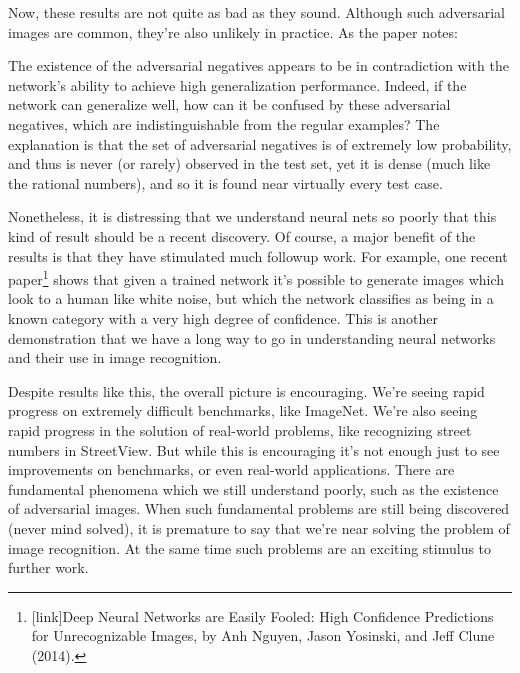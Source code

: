 \documentclass[a4paper,twoside,10pt]{book}
\begin{document}
Now, these results are not quite as bad as they sound. Although such adversarial images are common, they're also unlikely in practice. As the paper notes:
\begin{adjustwidth}{1.5cm}{0.5cm}
The existence of the adversarial negatives appears to be in contradiction with the network's ability to achieve high generalization performance. Indeed, if the network can generalize well, how can it be confused by these adversarial negatives, which are indistinguishable from the regular examples? The explanation is that the set of adversarial negatives is of extremely low probability, and thus is never (or rarely) observed in the test set, yet it is dense (much like the rational numbers), and so it is found near virtually every test case.
\end{adjustwidth}
Nonetheless, it is distressing that we understand neural nets so poorly that this kind of result should be a recent discovery. Of course, a major benefit of the results is that they have stimulated much followup work. For example, one recent paper\footnote{[link]Deep Neural Networks are Easily Fooled: High Confidence Predictions for Unrecognizable Images, by Anh Nguyen, Jason Yosinski, and Jeff Clune (2014).} shows that given a trained network it's possible to generate images which look to a human like white noise, but which the network classifies as being in a known category with a very high degree of confidence. This is another demonstration that we have a long way to go in understanding neural networks and their use in image recognition.

Despite results like this, the overall picture is encouraging. We're seeing rapid progress on extremely difficult benchmarks, like ImageNet. We're also seeing rapid progress in the solution of real-world problems, like recognizing street numbers in StreetView. But while this is encouraging it's not enough just to see improvements on benchmarks, or even real-world applications. There are fundamental phenomena which we still understand poorly, such as the existence of adversarial images. When such fundamental problems are still being discovered (never mind solved), it is premature to say that we're near solving the problem of image recognition. At the same time such problems are an exciting stimulus to further work.
\end{document}
